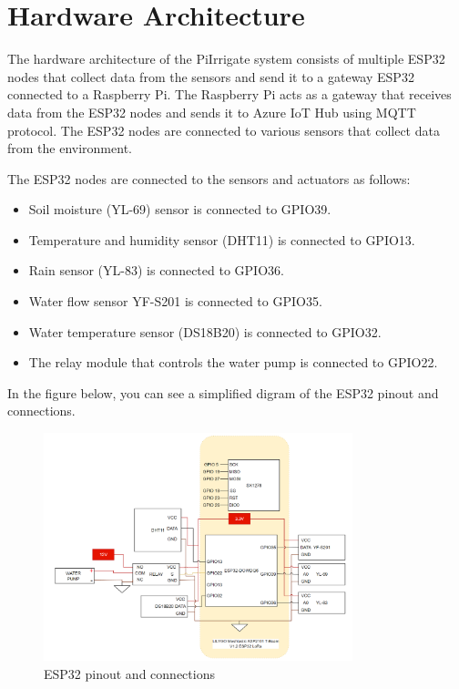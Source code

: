 \section{Hardware Architecture}
The hardware architecture of the PiIrrigate system consists 
of multiple ESP32 nodes that collect data from the sensors and send it to a gateway ESP32 connected to a Raspberry Pi.
The Raspberry Pi acts as a gateway that receives data from the ESP32 nodes and sends it to Azure IoT Hub using MQTT protocol.
The ESP32 nodes are connected to various sensors that collect data from the environment.

The ESP32 nodes are connected to the sensors and actuators as follows:
\begin{itemize}
  \item Soil moisture (YL-69) sensor is connected to GPIO39.
  \item Temperature and humidity sensor (DHT11) is connected to GPIO13.
  \item Rain sensor (YL-83) is connected to GPIO36.
  \item Water flow sensor {YF-S201} is connected to GPIO35.
  \item Water temperature sensor (DS18B20) is connected to GPIO32.
  \item The relay module that controls the water pump is connected to GPIO22.
\end{itemize}

In the figure below, you can see a simplified digram of the ESP32 pinout and connections.

\begin{figure}[H]
    \centering
    \includegraphics[width=0.8\textwidth]{images/esp-diagram.png}
    \caption{ESP32 pinout and connections}
    \label{fig:esp32-pinout}
\end{figure}

